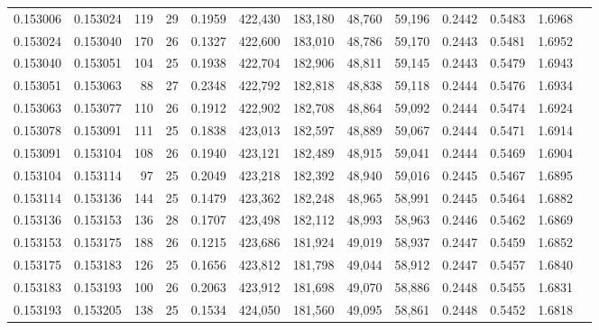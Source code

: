 \begin{tabular}{rrrrrrrrrrrrr}
0.153006 & 0.153024 & 119 &  29 &                                     0.1959 & 422,430 & 183,180 &  48,760 &  59,196 & 0.2442 & 0.5483 & 1.6968 \\
0.153024 & 0.153040 & 170 &  26 &                                     0.1327 & 422,600 & 183,010 &  48,786 &  59,170 & 0.2443 & 0.5481 & 1.6952 \\
0.153040 & 0.153051 & 104 &  25 &                                     0.1938 & 422,704 & 182,906 &  48,811 &  59,145 & 0.2443 & 0.5479 & 1.6943 \\
0.153051 & 0.153063 &  88 &  27 &                                     0.2348 & 422,792 & 182,818 &  48,838 &  59,118 & 0.2444 & 0.5476 & 1.6934 \\
0.153063 & 0.153077 & 110 &  26 &                                     0.1912 & 422,902 & 182,708 &  48,864 &  59,092 & 0.2444 & 0.5474 & 1.6924 \\
0.153078 & 0.153091 & 111 &  25 &                                     0.1838 & 423,013 & 182,597 &  48,889 &  59,067 & 0.2444 & 0.5471 & 1.6914 \\
0.153091 & 0.153104 & 108 &  26 &                                     0.1940 & 423,121 & 182,489 &  48,915 &  59,041 & 0.2444 & 0.5469 & 1.6904 \\
0.153104 & 0.153114 &  97 &  25 &                                     0.2049 & 423,218 & 182,392 &  48,940 &  59,016 & 0.2445 & 0.5467 & 1.6895 \\
0.153114 & 0.153136 & 144 &  25 &                                     0.1479 & 423,362 & 182,248 &  48,965 &  58,991 & 0.2445 & 0.5464 & 1.6882 \\
0.153136 & 0.153153 & 136 &  28 &                                     0.1707 & 423,498 & 182,112 &  48,993 &  58,963 & 0.2446 & 0.5462 & 1.6869 \\
0.153153 & 0.153175 & 188 &  26 &                                     0.1215 & 423,686 & 181,924 &  49,019 &  58,937 & 0.2447 & 0.5459 & 1.6852 \\
0.153175 & 0.153183 & 126 &  25 &                                     0.1656 & 423,812 & 181,798 &  49,044 &  58,912 & 0.2447 & 0.5457 & 1.6840 \\
0.153183 & 0.153193 & 100 &  26 &                                     0.2063 & 423,912 & 181,698 &  49,070 &  58,886 & 0.2448 & 0.5455 & 1.6831 \\
0.153193 & 0.153205 & 138 &  25 &                                     0.1534 & 424,050 & 181,560 &  49,095 &  58,861 & 0.2448 & 0.5452 & 1.6818 \\

\end{tabular}
